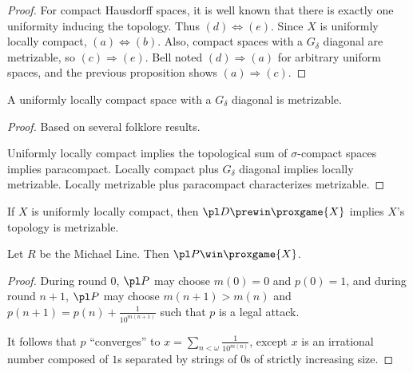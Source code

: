 \begin{proof}
  For compact Hausdorff spaces, it is well known that there is exactly one
  uniformity inducing the topology. Thus $(d)\Leftrightarrow(e)$. Since $X$
  is uniformly locally compact, $(a)\Leftrightarrow(b)$. Also, compact spaces
  with a $G_\delta$ diagonal are metrizable, so $(c)\Rightarrow(e)$. 
  Bell noted $(d)\Rightarrow(a)$ 
  for arbitrary uniform spaces, and the previous proposition shows
  $(a)\Rightarrow(c)$.
\end{proof}

\begin{thm}
  A uniformly locally compact space with a $G_\delta$ diagonal is metrizable.
\end{thm}

\begin{proof}
  Based on several folklore results.

  Uniformly locally compact implies the topological sum of $\sigma$-compact
  spaces implies paracompact. Locally compact plus $G_\delta$ diagonal implies
  locally metrizable. Locally metrizable plus paracompact characterizes
  metrizable.
\end{proof}

\begin{cor}
  If $X$ is uniformly locally compact, then $\pl D \prewin \proxgame{X}$ 
  implies $X$'s topology is metrizable.
\end{cor}





\newpage

\begin{ex}
  Let $R$ be the Michael Line. Then $\pl P\win \proxgame{X}$.
\end{ex}

\begin{proof}
  During round $0$, $\pl P$ may choose $m(0)=0$ and $p(0)=1$, 
  and during round $n+1$,
  $\pl P$ may choose $m(n+1)>m(n)$ and
  $p(n+1)=p(n)+\frac{1}{10^{m(n+1)}}$ such that $p$ is a legal attack.
  
  It follows that $p$ ``converges'' to 
  $x=\sum_{n<\omega}\frac{1}{10^{m(n)}}$, except $x$ is an irrational
  number composed of $1$s separated by strings of $0$s of strictly
  increasing size.
\end{proof}

